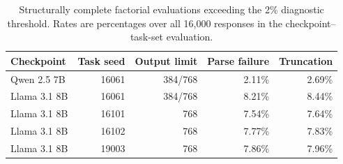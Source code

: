\begin{table}[t]
\centering\scriptsize
\caption{Structurally complete factorial evaluations exceeding the 2\% diagnostic threshold. Rates are percentages over all 16,000 responses in the checkpoint--task-set evaluation.}
\label{tab:alerts}
\begin{tabular}{@{}lrrrr@{}}
\toprule
Checkpoint & Task seed & Output limit & Parse failure & Truncation \\
\midrule
Qwen 2.5 7B & 16061 & 384/768 & 2.11\% & 2.69\% \\
Llama 3.1 8B & 16061 & 384/768 & 8.21\% & 8.44\% \\
Llama 3.1 8B & 16101 & 768 & 7.54\% & 7.64\% \\
Llama 3.1 8B & 16102 & 768 & 7.77\% & 7.83\% \\
Llama 3.1 8B & 19003 & 768 & 7.86\% & 7.96\% \\
\bottomrule
\end{tabular}
\end{table}
